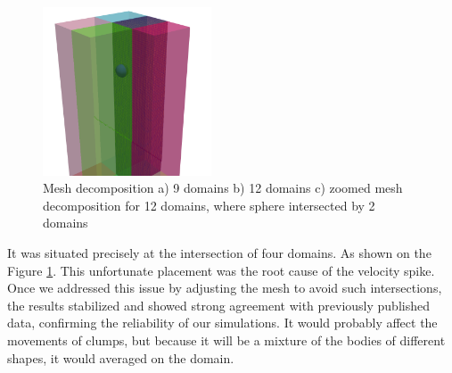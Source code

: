 \begin{figure}[!htp]
\begin{minipage}{7cm}
\subcaption{}
\end{minipage}
\newline
\begin{minipage}{7cm}
\includegraphics[width=5cm]{GWU_Thesis_Sarmakeeva/Images/chap3/decomp12_zoom.png}
\subcaption{}
\end{minipage}
\caption{Mesh decomposition a) 9 domains b) 12 domains c) zoomed mesh decomposition for 12 domains, where sphere intersected by 2 domains}
\label{decompositopn}
\end{figure}

It was situated precisely at the intersection of four domains. As shown on the Figure \ref{decompositopn}. This unfortunate placement was the root cause of the velocity spike. Once we addressed this issue by adjusting the mesh to avoid such intersections, the results stabilized and showed strong agreement with previously published data, confirming the reliability of our simulations. It would probably affect the movements of clumps, but because it will be a mixture of the bodies of different shapes, it would averaged on the domain.





